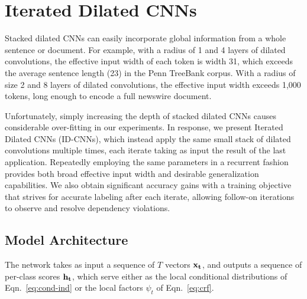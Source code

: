 \section{Iterated Dilated CNNs}
\label{blocks-section}
Stacked dilated CNNs can easily incorporate global information from a whole sentence or document. For example, with a radius of 1 and 4 layers of dilated convolutions, the effective input width of each token is width 31, which exceeds the average sentence length (23) in the Penn TreeBank corpus. With a radius of size 2 and 8 layers of dilated convolutions, the effective input width exceeds 1,000 tokens, long enough to encode a full newswire document.

Unfortunately, simply increasing the depth of stacked dilated CNNs causes considerable over-fitting in our experiments. In response, we present Iterated Dilated CNNs (ID-CNNs), which instead apply the same small stack of dilated convolutions multiple times, each iterate taking as input the result of the last application. Repeatedly employing the same parameters in a recurrent fashion provides both broad effective input width and desirable generalization capabilities. We also obtain significant accuracy gains with a training objective that strives for accurate labeling after each iterate, allowing follow-on iterations to observe and resolve dependency violations.


\subsection{Model Architecture\label{model-section}}
The network takes as input a sequence of $T$ vectors ${\bf x_t}$, and outputs a sequence of per-class scores ${\bf h_t}$, which serve either as the local conditional distributions of Eqn.~\eqref{eq:cond-ind} or the local factors $\psi_t$ of Eqn.~\eqref{eq:crf}. 



